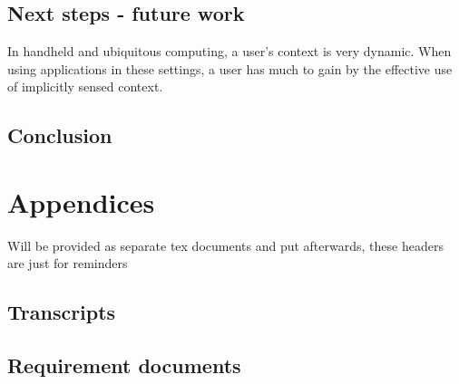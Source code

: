 \documentclass[]{report}
\begin{document}
\section{Next steps - future work}

In handheld and ubiquitous computing, a user's context is very dynamic. When
using applications in these settings, a user has much to gain by the effective
use of implicitly sensed context\cite{dey99:towar}.

\section{Conclusion}

{}



\chapter{Appendices}

Will be provided as separate tex documents and put afterwards, these headers are
just for reminders

\section{Transcripts}

\section{Requirement documents}
\end{document}
